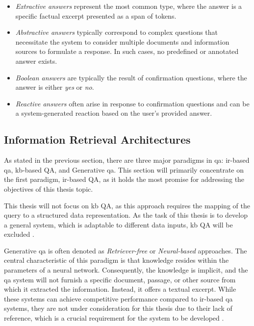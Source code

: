 \begin{itemize}
   \item \textit{Extractive answers} represent the most common type, where the answer is a specific factual excerpt presented as a span of tokens.

   \item \textit{Abstractive answers} typically correspond to complex questions that necessitate the system to consider multiple documents and information sources to formulate a response. In such cases, no predefined or annotated answer exists.

   \item \textit{Boolean answers} are typically the result of confirmation questions, where the answer is either \textit{yes} or \textit{no}.

   \item \textit{Reactive answers} often arise in response to confirmation questions and can be a system-generated reaction based on the user's provided answer.
\end{itemize}


\subsection{Information Retrieval Architectures}
\label{subsec:qa_architectures}

As stated in the previous section, there are three major paradigms in \gls{qa}: \gls{ir}-based \gls{qa}, \gls{kb}-based QA, and Generative \gls{qa}. This section will primarily concentrate on the first paradigm, \gls{ir}-based QA, as it holds the most promise for addressing the objectives of this thesis topic.

This thesis will not focus on \gls{kb} QA, as this approach requires the mapping of the query to a structured data representation. As the task of this thesis is to develop a general system, which is adaptable to different data inputs, \gls{kb} QA will be excluded \cite{dimitrakis_survey_2020}.

Generative \gls{qa} is often denoted as \textit{Retriever-free} or \textit{Neural-based} approaches. The central characteristic of this paradigm is that knowledge resides within the parameters of a neural network. Consequently, the knowledge is implicit, and the \gls{qa} system will not furnish a specific document, passage, or other source from which it extracted the information. Instead, it offers a textual excerpt. While these systems can achieve competitive performance compared to \gls{ir}-based \gls{qa} systems, they are not under consideration for this thesis due to their lack of reference, which is a crucial requirement for the system to be developed \cite{roberts_how_2020}.


